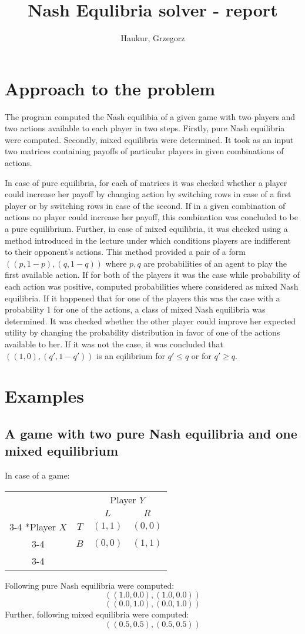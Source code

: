 \documentclass{article}
\title{Nash Equlibria solver - report}
\author{Haukur, Grzegorz}
\begin{document}
\maketitle
\section{Approach to the problem}
The program computed the Nash equilibia of a given game with two players and two actions available to each player in two steps. Firstly, pure Nash equilibria were computed. Secondly, mixed equilibria were determined. It took as an input two matrices containing payoffs of particular players in given combinations of actions.

In case of pure equilibria, for each of matrices it was checked whether a player could increase her payoff by changing action by switching rows in case of a first player or by switching rows in case of the second. If in a given combination of actions no player could increase her payoff, this combination was concluded to be a pure equilibrium. Further, in case of mixed equilibria, it was checked using a method introduced in the lecture under which conditions players are indifferent to their opponent's actions. This method provided a pair of a form $((p, 1-p),(q, 1-q))$ where $p,q$  are probabilities of an agent to play the first available action. If for both of the players it was the case while probability of each action was positive, computed probabilities where considered as mixed Nash equilibria. If it happened that for one of the players this was the case with a probability 1 for one of the actions, a class of mixed Nash equilibria was determined. It was checked whether the other player could improve her expected utility by changing the probability distribution in favor of one of the actions available to her. If it was not the case, it was concluded that  $((1,0),(q', 1-q'))$ is an eqilibrium for $q' \leq q$   or for $q' \geq q$.
\section{Examples}
\subsection{A game with two pure Nash equilibria and one mixed equilibrium}
In case of a game:
\begin{table}[H]
    \setlength{\extrarowheight}{2pt}
    \begin{tabular}{cc|c|c|}
      & \multicolumn{1}{c}{} & \multicolumn{2}{c}{Player $Y$}\\
      & \multicolumn{1}{c}{} & \multicolumn{1}{c}{$L$}  & \multicolumn{1}{c}{$R$} \\\cline{3-4}
      \multirow{2}*{Player $X$}  & $T$ & $(1,1)$ & $(0,0)$ \\\cline{3-4}
      & $B$ & $(0,0)$ & $(1,1)$ \\\cline{3-4}
    \end{tabular}
  \end{table}
   Following pure Nash equilibria were computed:
  $$((1.0,0.0),(1.0,0.0))$$
$$((0.0,1.0),(0.0,1.0))$$
  Further, following mixed equilibria were computed:
  $$((0.5,0.5),(0.5,0.5))$$
\end{document}

